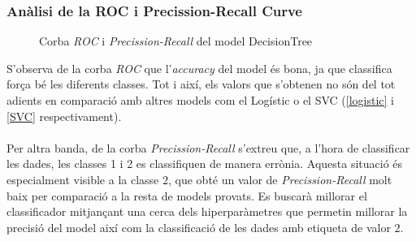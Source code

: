 \documentclass[a4paper, 11pt]{article}
\begin{document}
\subsubsection{Anàlisi de la ROC i Precission-Recall Curve} \label{ROC_DECISIONTREE}
\begin{figure}[h]
\centering
    \caption{Corba \textit{ROC} i \textit{Precission-Recall} del model DecisionTree}
    \label{fig:my_label}
\end{figure}
\hspace{-1.6em}S'observa de la corba \textit{ROC} que l'\textit{accuracy} del model és bona, ja que classifica força bé les diferents classes. Tot i així, els valors que s'obtenen no són del tot adients en comparació amb altres models com el Logístic o el SVC (\textcolor{blue}{\ref{logistic}} i \textcolor{blue}{\ref{SVC}} respectivament).\\\\
Per altra banda, de la corba \textit{Precission-Recall} s'extreu que, a l'hora de classificar les dades, les classes 1 i 2 es classifiquen de manera errònia. Aquesta situació és especialment visible a la classe $2$, que obté un valor de \textit{Precission-Recall} molt baix per comparació a la resta de models provats.
Es buscarà millorar el classificador mitjançant una cerca dels hiperparàmetres que permetin millorar la precisió del model així com la classificació de les dades amb etiqueta de valor $2$.
\newpage
\end{document}
